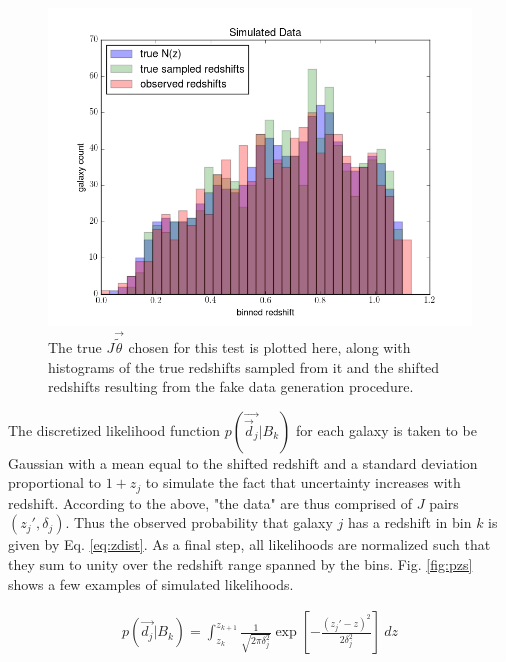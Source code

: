 \documentclass[12pt, onecolumn]{emulateapj}
\begin{document}
\begin{figure}
\label{fig:samples}
\includegraphics[scale=0.5]{simdata.png}
\caption{The true $J\vec{\tilde{\theta}}$ chosen for this test is plotted here, along with histograms of the true redshifts sampled from it and the shifted redshifts resulting from the fake data generation procedure.}
\end{figure}

The discretized likelihood function $p(\vec{\vec{d}_{j}}|B_{k})$ for each galaxy is taken to be Gaussian with a mean equal to the shifted redshift and a standard deviation proportional to $1+z_{j}$ to simulate the fact that uncertainty increases with redshift.  According to the above, "the data" are thus comprised of $J$ pairs $(z_{j}',\delta_{j})$.  Thus the observed probability that galaxy $j$ has a redshift in bin $k$ is given by Eq. \ref{eq:zdist}.  As a final step, all likelihoods are normalized such that they sum to unity over the redshift range spanned by the bins.  Fig. \ref{fig:pzs} shows a few examples of simulated likelihoods.

\begin{eqnarray}
\label{eq:zdist}
p(\vec{d_{j}}|B_{k}) = \int_{z_{k}}^{z_{k+1}} \frac{1}{\sqrt{2\pi\delta_{j}^{2}}}\exp\left[-\frac{(z_{j}'-z)^{2}}{2\delta_{j}^{2}}\right]\ dz
\end{eqnarray}
\end{document}
